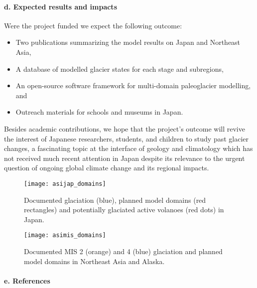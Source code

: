 \documentclass{article}
\begin{document}
\paragraph{d. Expected results and impacts}

    Were the project funded we expect the following outcome:

    \begin{itemize}
      \item{Two publications summarizing the model results on Japan and
            Northeast Asia,}
      \item{A database of modelled glacier states for each stage and
            subregions,}
      \item{An open-source software framework for multi-domain paleoglacier
            modelling, and}
      \item{Outreach materials for schools and museums in Japan.}
    \end{itemize}

    Besides academic contributions, we hope that the project's outcome will
    revive the interest of Japanese researchers, students, and children to
    study past glacier changes, a fascinating topic at the interface of geology
    and climatology which has not received much recent attention in Japan
    despite its relevance to the urgent question of ongoing global climate
    change and its regional impacts.

    \begin{figure}
      \centerline{\texttt{[image: asijap\_domains]}}
      \caption{%
        Documented glaciation (blue), planned model domains (red rectangles)
        and potentially glaciated active volanoes (red dots) in Japan.}
      \label{fig:japan}
    \end{figure}

    \begin{figure}
      \centerline{\texttt{[image: asimis\_domains]}}
      \caption{%
        Documented MIS 2 (orange) and 4 (blue) glaciation and planned model
        domains in Northeast Asia and Alaska.}
      \label{fig:asia}
    \end{figure}

\paragraph{e. References}
\end{document}
